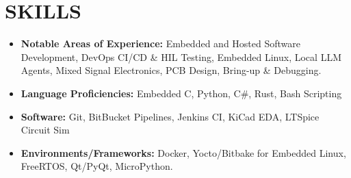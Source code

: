 
\section{SKILLS}
\begin{minipage}{\maincolumnwidth}%
	\small{
    	\begin{itemize}
        \item \textbf{Notable Areas of Experience:} Embedded and Hosted Software Development, DevOps CI/CD \& HIL Testing, Embedded Linux, Local LLM Agents, Mixed Signal Electronics, PCB Design, Bring-up \& Debugging.
        \item \textbf{Language Proficiencies:} Embedded C, Python, C\#, Rust, Bash Scripting
        \item \textbf{Software:} Git, BitBucket Pipelines, Jenkins CI, KiCad EDA, LTSpice Circuit Sim  
        \item \textbf{Environments/Frameworks:} Docker, Yocto/Bitbake for Embedded Linux, FreeRTOS, Qt/PyQt, MicroPython.
		\end{itemize}}%
\end{minipage}
      


